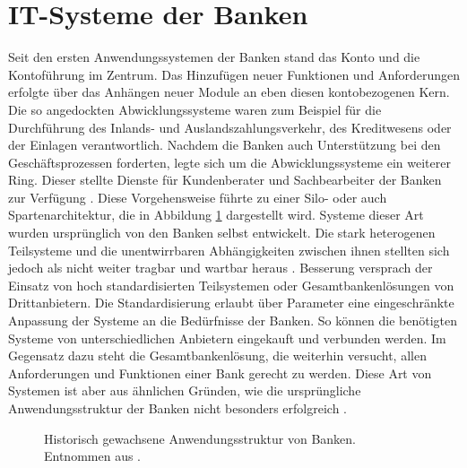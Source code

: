 \documentclass[12pt,oneside,a4paper,parskip]{scrbook}
\begin{document}
\section{IT-Systeme der Banken}
Seit den ersten Anwendungssystemen der Banken stand das Konto und die Kontoführung im Zentrum. Das Hinzufügen neuer Funktionen und Anforderungen erfolgte über das Anhängen neuer Module an eben diesen kontobezogenen Kern. Die so angedockten Abwicklungssysteme waren zum Beispiel für die Durchführung des Inlands- und Auslandszahlungsverkehr, des Kreditwesens oder der Einlagen verantwortlich. Nachdem die Banken auch Unterstützung bei den Geschäftsprozessen forderten, legte sich um die Abwicklungssysteme ein weiterer Ring. Dieser stellte Dienste für Kundenberater und Sachbearbeiter der Banken zur Verfügung \cite[18-20]{ITidF}\cite{SuPdIiB}. Diese Vorgehensweise führte zu einer Silo- oder auch Spartenarchitektur, die in Abbildung \ref{zwiebel} dargestellt wird. Systeme dieser Art wurden ursprünglich von den Banken selbst entwickelt. Die stark heterogenen Teilsysteme und die unentwirrbaren Abhängigkeiten zwischen ihnen stellten sich jedoch als nicht weiter tragbar und wartbar heraus \cite{bankEnzy}\cite{SuPdIiB}\cite[52]{ITidF}. Besserung versprach der Einsatz von hoch standardisierten Teilsystemen oder Gesamtbankenlösungen von Drittanbietern. Die Standardisierung erlaubt über Parameter eine eingeschränkte Anpassung der Systeme an die Bedürfnisse der Banken. So können die benötigten Systeme von unterschiedlichen Anbietern eingekauft und verbunden werden. Im Gegensatz dazu steht die Gesamtbankenlösung, die weiterhin versucht, allen Anforderungen und Funktionen einer Bank gerecht zu werden. Diese Art von Systemen ist aber aus ähnlichen Gründen, wie die ursprüngliche Anwendungsstruktur der Banken nicht besonders erfolgreich \cite[S. 56 ff.]{ITidF}. 

\begin{figure}
  \caption[Historische Anwendungsstruktur von Banken]{Historisch gewachsene Anwendungsstruktur von Banken. Entnommen aus \cite{SuPdIiB}.}
  \label{zwiebel}
\end{figure}
\end{document}
